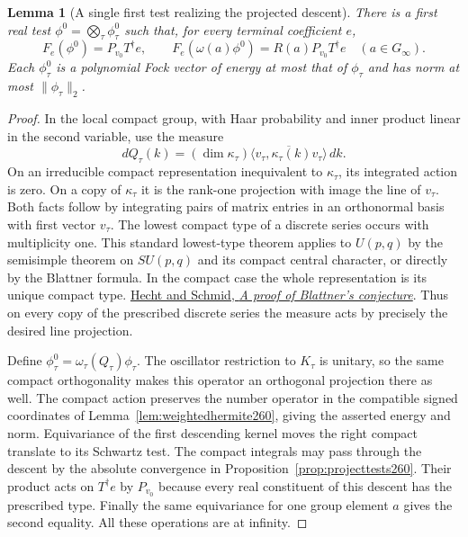 \documentclass[a4paper,11pt]{article}
\newtheorem{lemma}[proposition]{Lemma}
\theoremstyle{definition}
\theoremstyle{remark}
\numberwithin{equation}{section}
\begin{document}
\begin{lemma}[A single first test realizing the projected descent]\leavevmode
\label{lem:project271}
There is a first real test \(\phi^0=\bigotimes_\tau\phi^0_\tau\)
such that, for every terminal coefficient \(e\),
\[
 F_e(\phi^0)=P_{v_0}T^\dagger e,\qquad
 F_e(\omega(a)\phi^0)=R(a)P_{v_0}T^\dagger e
 \quad (a\in G_\infty).
\]
Each \(\phi^0_\tau\) is a polynomial Fock vector of energy
at most that of \(\phi_\tau\) and has norm at most
\(\|\phi_\tau\|_2\).
\end{lemma}
\begin{proof}
In the local compact group, with Haar probability and inner
product linear in the second variable, use the measure
\[
 dQ_\tau(k)=
 (\dim\kappa_\tau)\overline{\langle v_\tau,\kappa_\tau(k)v_\tau\rangle}\,dk .
\]
On an irreducible compact representation inequivalent to
\(\kappa_\tau\), its integrated action is zero. On a copy of
\(\kappa_\tau\) it is the rank-one projection with image the
line of \(v_\tau\). Both facts follow by integrating pairs of
matrix entries in an orthonormal basis with first vector
\(v_\tau\). The lowest compact type of a discrete series
occurs with multiplicity one. This standard lowest-type theorem
applies to \(U(p,q)\) by the semisimple theorem on \(SU(p,q)\)
and its compact central character, or directly by the Blattner
formula. In the compact case the whole representation is its
unique compact type.
\href{https://doi.org/10.1007/BF01404112}{Hecht and Schmid,
\emph{A proof of Blattner's conjecture}}.
Thus on every copy of the prescribed discrete series the
measure acts by precisely the desired line projection.

Define \(\phi^0_\tau=\omega_\tau(Q_\tau)\phi_\tau\).
The oscillator restriction to \(K_\tau\) is unitary, so
the same compact orthogonality makes this operator an
orthogonal projection there as well. The compact action
preserves the number operator in the compatible signed
coordinates of Lemma~\ref{lem:weightedhermite260}, giving
the asserted energy and norm. Equivariance of the first
descending kernel moves the right compact translate to
its Schwartz test. The compact integrals may pass through
the descent by the absolute convergence in
Proposition~\ref{prop:projecttests260}. Their product acts
on \(T^\dagger e\) by \(P_{v_0}\) because every real
constituent of this descent has the prescribed type.
Finally the same equivariance for one group element \(a\)
gives the second equality. All these operations are at
infinity.
\end{proof}
\end{document}
